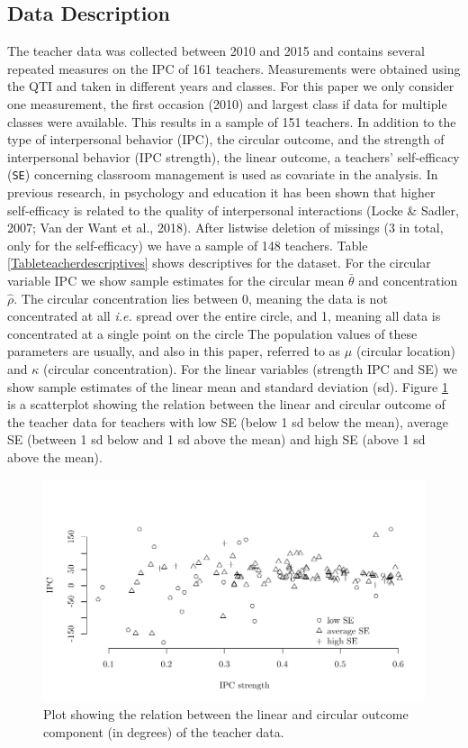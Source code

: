 \documentclass[man]{apa6}
\DeclareRobustCommand{\VANDER}[3]{#2}
\theoremstyle{definition}
\theoremstyle{definition}
\theoremstyle{definition}
\theoremstyle{remark}
\begin{document}
\subsection{Data Description}\label{DataDescriptives}

The teacher data was collected between 2010 and 2015 and contains
several repeated measures on the IPC of 161 teachers. Measurements were
obtained using the QTI and taken in different years and classes. For
this paper we only consider one measurement, the first occasion (2010)
and largest class if data for multiple classes were available. This
results in a sample of 151 teachers. In addition to the type of
interpersonal behavior (IPC), the circular outcome, and the strength of
interpersonal behavior (IPC strength), the linear outcome, a teachers'
self-efficacy (\verb|SE|) concerning classroom management is used as
covariate in the analysis. In previous research, in psychology and
education it has been shown that higher self-efficacy is related to the
quality of interpersonal interactions (Locke \& Sadler, 2007;
\VANDER{Want}{Van der}{van der} Want et al., 2018). After listwise
deletion of missings (\(3\) in total, only for the self-efficacy) we
have a sample of 148 teachers. Table \ref{Tableteacherdescriptives}
shows descriptives for the dataset. For the circular variable IPC we
show sample estimates for the circular mean \(\bar{\theta}\) and
concentration \(\hat{\rho}\). The circular concentration lies between 0,
meaning the data is not concentrated at all \emph{i.e.} spread over the
entire circle, and 1, meaning all data is concentrated at a single point
on the circle The population values of these parameters are usually, and
also in this paper, referred to as \(\mu\) (circular location) and
\(\kappa\) (circular concentration). For the linear variables (strength
IPC and SE) we show sample estimates of the linear mean and standard
deviation (sd). Figure \ref{dataplot} is a scatterplot showing the
relation between the linear and circular outcome of the teacher data for
teachers with low SE (below 1 sd below the mean), average SE (between 1
sd below and 1 sd above the mean) and high SE (above 1 sd above the
mean).

\begin{figure}
\centering
\includegraphics[width = \textwidth]{Plots/dataplot.pdf}
\caption{Plot showing the relation between the linear and circular outcome component (in degrees) of the teacher data.}
\label{dataplot}
\end{figure}
\end{document}
